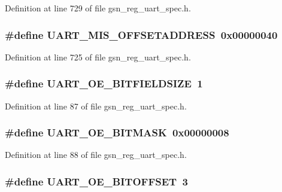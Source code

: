 Definition at line 729 of file gsn\_\-reg\_\-uart\_\-spec.h.

\hypertarget{a00575_a114f9a612f68d2d99e26642631dc2dd1}{
\subsubsection[{UART\_\-MIS\_\-OFFSETADDRESS}]{\setlength{\rightskip}{0pt plus 5cm}\#define UART\_\-MIS\_\-OFFSETADDRESS~0x00000040}}
\label{a00575_a114f9a612f68d2d99e26642631dc2dd1}


Definition at line 725 of file gsn\_\-reg\_\-uart\_\-spec.h.

\hypertarget{a00575_ae186cec0dfb5f8ac65d2190a99b8492a}{
\subsubsection[{UART\_\-OE\_\-BITFIELDSIZE}]{\setlength{\rightskip}{0pt plus 5cm}\#define UART\_\-OE\_\-BITFIELDSIZE~1}}
\label{a00575_ae186cec0dfb5f8ac65d2190a99b8492a}


Definition at line 87 of file gsn\_\-reg\_\-uart\_\-spec.h.

\hypertarget{a00575_a1d4c5db79b5c0724d82c1c1c81823ecc}{
\subsubsection[{UART\_\-OE\_\-BITMASK}]{\setlength{\rightskip}{0pt plus 5cm}\#define UART\_\-OE\_\-BITMASK~0x00000008}}
\label{a00575_a1d4c5db79b5c0724d82c1c1c81823ecc}


Definition at line 88 of file gsn\_\-reg\_\-uart\_\-spec.h.

\hypertarget{a00575_a4a2f6cc4fe8c5ced6c62698f799ec8c7}{
\subsubsection[{UART\_\-OE\_\-BITOFFSET}]{\setlength{\rightskip}{0pt plus 5cm}\#define UART\_\-OE\_\-BITOFFSET~3}}
\label{a00575_a4a2f6cc4fe8c5ced6c62698f799ec8c7}


